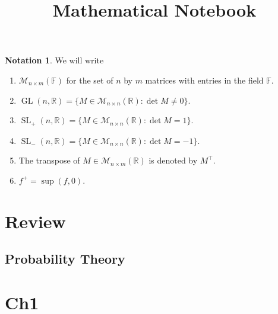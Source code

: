 \documentclass[]{article}
\title{Mathematical Notebook}
\author{}
\date{}
\DeclareMathOperator{\GL}{GL}
\DeclareMathOperator{\SL}{SL}
\newcommand {\RR}{\mathbb{R}}
\newcommand {\FF}{\mathbb{F}}
\theoremstyle{definition}
\newtheorem{notation}{Notation}
\begin{document}
\maketitle
\begin{notation} We will write
	\begin{enumerate}
		\item $\mathcal{M}_{n \times m}(\FF)$ for the set of $n$ by $m$ matrices with entries in the field $\FF$.
		\item $\GL(n, \RR) = \{ M \in \mathcal{M}_{n \times n} (\RR): \det M \neq 0 \}$.
		\item $\SL_+(n, \RR) = \{ M \in \mathcal{M}_{n \times n} (\RR): \det M = 1  \}$.
		\item $\SL_-(n, \RR) = \{ M \in \mathcal{M}_{n \times n} (\RR): \det M = -1  \}$.
		\item The transpose of $M \in \mathcal{M}_{n \times m} (\RR) $ is denoted by $M^\intercal$.
		\item $f^+ = \sup(f,0)$.
	\end{enumerate}
\end{notation}

\section{Review}


\subsection{Probability Theory}


\section{Ch1}




\end{document}
